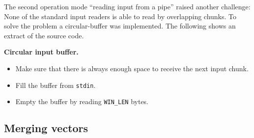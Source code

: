 The second operation mode ``reading input from a pipe'' raised another
challenge: None of the standard input readers is able to read by
overlapping chunks. To solve the problem a circular-buffer was
implemented. The following shows an extract of the source code.

\textbf{Circular input buffer.}

\begin{Shaded}
\begin{Highlighting}[]
 
     
         
         
        \NormalTok{;}
    \NormalTok{\}}
     
          
          \NormalTok{\{}
            \NormalTok{;}
            \NormalTok{;}
        \NormalTok{\}}
         
    \NormalTok{\}}
     
    \NormalTok{\}}
\NormalTok{\}}
\end{Highlighting}
\end{Shaded}

\begin{itemize}
\item
  Make sure that there is always enough space to receive the next input
  chunk.
\item
  Fill the buffer from \texttt{stdin}.
\item
  Empty the buffer by reading \texttt{WIN\_LEN} bytes.
\end{itemize}

\hypertarget{_merging_vectors}{\subsection{Merging
vectors}\label{_merging_vectors}}

